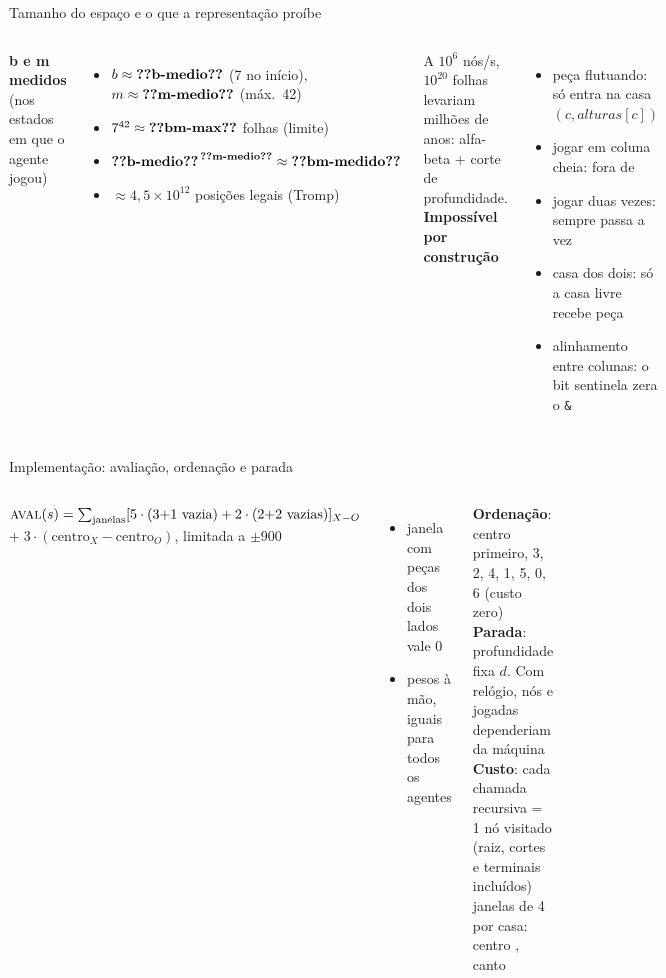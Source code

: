 \documentclass[10pt,aspectratio=169]{beamer}
\newcommand{\fn}[1]{\text{\footnotesize\MakeUppercase{#1}}}
\begin{document}
\begin{frame}{Tamanho do espaço e o que a representação proíbe}
\begin{columns}[t]
\textbf{b e m medidos} (nos estados em que o agente jogou)
\begin{itemize}\small
  \item $b \approx \dado{b-medio}$ (7 no início), $m \approx \dado{m-medio}$ (máx.\ 42)
  \item $7^{42} \approx \dado{bm-max}$ folhas (limite)
  \item $\dado{b-medio}^{\,\dado{m-medio}} \approx \dado{bm-medido}$
  \item $\approx 4{,}5\times10^{12}$ posições legais (Tromp)
\end{itemize}
\alert{A $10^6$ nós/s, $10^{20}$ folhas levariam milhões de anos}: alfa-beta + corte de profundidade.
\textbf{Impossível por construção}
\begin{itemize}\small
  \item peça flutuando: só entra na casa $(c, \mathit{alturas}[c])$
  \item jogar em coluna cheia: fora de \fn{Ações}
  \item jogar duas vezes: \fn{Resultado} sempre passa a vez
  \item casa dos dois: só a casa livre recebe peça
  \item alinhamento entre colunas: o bit sentinela zera o \texttt{\&}
\end{itemize}
\end{columns}
\end{frame}

\begin{frame}{Implementação: avaliação, ordenação e parada}
\begin{columns}[c]
\small
$\fn{Aval}(s) = \sum_{\text{janelas}} [5\cdot\text{(3+1 vazia)} + 2\cdot\text{(2+2 vazias)}]_{X - O}$\\
\hspace*{4.2em}$+\; 3\cdot(\text{centro}_X - \text{centro}_O)$, limitada a $\pm 900$
\begin{itemize}
  \item janela com peças dos dois lados vale 0
  \item pesos à mão, iguais para todos os agentes
\end{itemize}
\textbf{Ordenação}: centro primeiro, 3, 2, 4, 1, 5, 0, 6 (custo zero)\\[3pt]
\textbf{Parada}: profundidade fixa $d$. Com relógio, nós e jogadas dependeriam da máquina\\[3pt]
\textbf{Custo}: cada chamada recursiva = 1 nó visitado (raiz, cortes e terminais incluídos)
\centering
\mapaJanelas[x=5mm,y=5mm]\\[2pt]
{\scriptsize janelas de 4 por casa: centro , canto }
\end{columns}
\end{frame}
\end{document}
